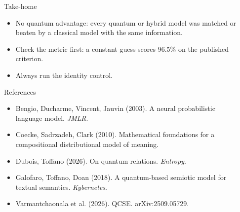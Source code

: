 \documentclass[final]{beamer}
\newlength{\sepwidth}
\newlength{\colwidth}
\newcommand{\separatorcolumn}{\begin{column}{\sepwidth}\end{column}}
\begin{document}
\begin{frame}[t]
\begin{columns}[t]
\begin{column}{\colwidth}
\begin{alertblock}{Take-home}
\begin{itemize}
\item No quantum advantage: every quantum or hybrid model was matched or beaten by a classical model with the same information.
\item Check the metric first: a constant guess scores $96.5\%$ on the published criterion.
\item Always run the identity control.
\end{itemize}
\end{alertblock}

\begin{block}{References}
\small
\begin{itemize}
\item Bengio, Ducharme, Vincent, Jauvin (2003). A neural probabilistic language model. \emph{JMLR}.
\item Coecke, Sadrzadeh, Clark (2010). Mathematical foundations for a compositional distributional model of meaning.
\item Dubois, Toffano (2026). On quantum relations. \emph{Entropy}.
\item Galofaro, Toffano, Doan (2018). A quantum-based semiotic model for textual semantics. \emph{Kybernetes}.
\item Varmantchaonala et al. (2026). QCSE. arXiv:2509.05729.
\end{itemize}
\end{block}
\end{column}

\separatorcolumn
\end{columns}
\end{frame}
\end{document}
